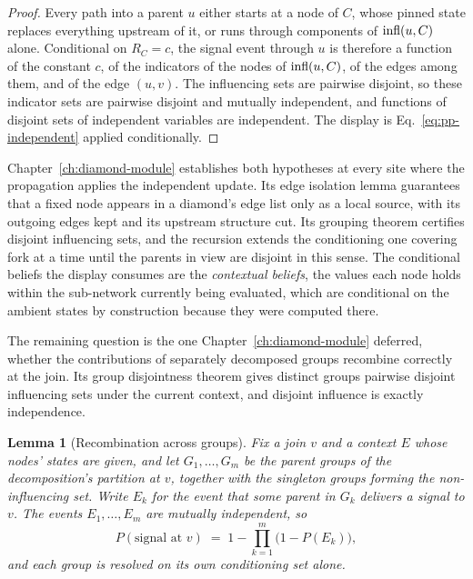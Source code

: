 \documentclass[12pt]{report}
\newtheorem{lemma}[theorem]{Lemma}
\begin{document}
\begin{proof}
Every path into a parent $u$ either starts at a node of $C$, whose pinned state replaces everything upstream of it, or runs through components of $\mathrm{infl}(u, C)$ alone. Conditional on $R_C = c$, the signal event through $u$ is therefore a function of the constant $c$, of the indicators of the nodes of $\mathrm{infl}(u, C)$, of the edges among them, and of the edge $(u,v)$. The influencing sets are pairwise disjoint, so these indicator sets are pairwise disjoint and mutually independent, and functions of disjoint sets of independent variables are independent. The display is Eq.~\eqref{eq:pp-independent} applied conditionally.
\end{proof}

Chapter~\ref{ch:diamond-module} establishes both hypotheses at every site where the propagation applies the independent update. Its edge isolation lemma guarantees that a fixed node appears in a diamond's edge list only as a local source, with its outgoing edges kept and its upstream structure cut. Its grouping theorem certifies disjoint influencing sets, and the recursion extends the conditioning one covering fork at a time until the parents in view are disjoint in this sense. The conditional beliefs the display consumes are the \emph{contextual beliefs}, the values each node holds within the sub-network currently being evaluated, which are conditional on the ambient states by construction because they were computed there.

The remaining question is the one Chapter~\ref{ch:diamond-module} deferred, whether the contributions of separately decomposed groups recombine correctly at the join. Its group disjointness theorem gives distinct groups pairwise disjoint influencing sets under the current context, and disjoint influence is exactly independence.

\begin{lemma}[Recombination across groups]
\label{lem:pp-recombination}
Fix a join $v$ and a context $E$ whose nodes' states are given, and let $G_1, \dots, G_m$ be the parent groups of the decomposition's partition at $v$, together with the singleton groups forming the non-influencing set. Write $E_k$ for the event that some parent in $G_k$ delivers a signal to $v$. The events $E_1, \dots, E_m$ are mutually independent, so
\[
P(\text{signal at } v) \;=\; 1 - \prod_{k=1}^{m} \bigl( 1 - P(E_k) \bigr),
\]
and each group is resolved on its own conditioning set alone.
\end{lemma}
\end{document}
